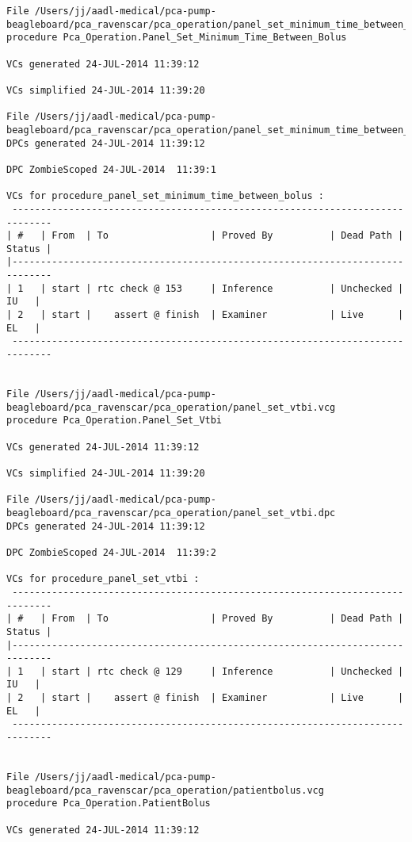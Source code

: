 \begin{lstlisting}[frame=single, gobble=0, caption={POGS report for PCA Pump prototype}]
File /Users/jj/aadl-medical/pca-pump-beagleboard/pca_ravenscar/pca_operation/panel_set_minimum_time_between_bolus.vcg
procedure Pca_Operation.Panel_Set_Minimum_Time_Between_Bolus

VCs generated 24-JUL-2014 11:39:12

VCs simplified 24-JUL-2014 11:39:20

File /Users/jj/aadl-medical/pca-pump-beagleboard/pca_ravenscar/pca_operation/panel_set_minimum_time_between_bolus.dpc
DPCs generated 24-JUL-2014 11:39:12

DPC ZombieScoped 24-JUL-2014  11:39:1

VCs for procedure_panel_set_minimum_time_between_bolus :
 -----------------------------------------------------------------------------
| #   | From  | To                  | Proved By          | Dead Path | Status |
|-----------------------------------------------------------------------------
| 1   | start | rtc check @ 153     | Inference          | Unchecked |   IU   |
| 2   | start |    assert @ finish  | Examiner           | Live      |   EL   |
 -----------------------------------------------------------------------------


File /Users/jj/aadl-medical/pca-pump-beagleboard/pca_ravenscar/pca_operation/panel_set_vtbi.vcg
procedure Pca_Operation.Panel_Set_Vtbi

VCs generated 24-JUL-2014 11:39:12

VCs simplified 24-JUL-2014 11:39:20

File /Users/jj/aadl-medical/pca-pump-beagleboard/pca_ravenscar/pca_operation/panel_set_vtbi.dpc
DPCs generated 24-JUL-2014 11:39:12

DPC ZombieScoped 24-JUL-2014  11:39:2

VCs for procedure_panel_set_vtbi :
 -----------------------------------------------------------------------------
| #   | From  | To                  | Proved By          | Dead Path | Status |
|-----------------------------------------------------------------------------
| 1   | start | rtc check @ 129     | Inference          | Unchecked |   IU   |
| 2   | start |    assert @ finish  | Examiner           | Live      |   EL   |
 -----------------------------------------------------------------------------


File /Users/jj/aadl-medical/pca-pump-beagleboard/pca_ravenscar/pca_operation/patientbolus.vcg
procedure Pca_Operation.PatientBolus

VCs generated 24-JUL-2014 11:39:12


\end{lstlisting}

